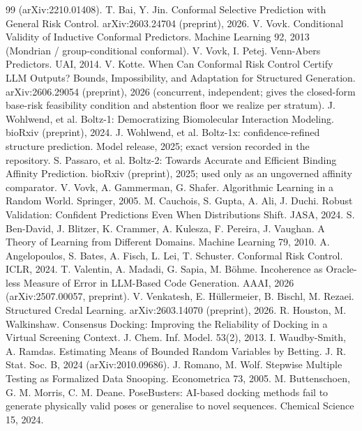 \documentclass[10pt]{article}
\begin{document}
\begin{thebibliography}{99}
(arXiv:2210.01408).
 T. Bai, Y. Jin. Conformal Selective Prediction with General Risk Control.
arXiv:2603.24704 (preprint), 2026.
 V. Vovk. Conditional Validity of Inductive Conformal Predictors. Machine Learning 92, 2013
(Mondrian / group-conditional conformal).
 V. Vovk, I. Petej. Venn-Abers Predictors. UAI, 2014.
 V. Kotte. When Can Conformal Risk Control Certify LLM Outputs? Bounds, Impossibility, and
Adaptation for Structured Generation. arXiv:2606.29054 (preprint), 2026 (concurrent, independent; gives the
closed-form base-risk feasibility condition and abstention floor we realize per stratum).
 J. Wohlwend, et al. Boltz-1: Democratizing Biomolecular Interaction Modeling. bioRxiv
(preprint), 2024.
 J. Wohlwend, et al. Boltz-1x: confidence-refined structure prediction. Model release,
2025; exact version recorded in the repository.
 S. Passaro, et al. Boltz-2: Towards Accurate and Efficient Binding Affinity Prediction.
bioRxiv (preprint), 2025; used only as an ungoverned affinity comparator.
 V. Vovk, A. Gammerman, G. Shafer. Algorithmic Learning in a Random World. Springer, 2005.
 M. Cauchois, S. Gupta, A. Ali, J. Duchi. Robust Validation: Confident Predictions
Even When Distributions Shift. JASA, 2024.
 S. Ben-David, J. Blitzer, K. Crammer, A. Kulesza, F. Pereira, J. Vaughan.
A Theory of Learning from Different Domains. Machine Learning 79, 2010.
 A. Angelopoulos, S. Bates, A. Fisch, L. Lei, T. Schuster.
Conformal Risk Control. ICLR, 2024.
 T. Valentin, A. Madadi, G. Sapia, M. B\"ohme. Incoherence as Oracle-less Measure of
Error in LLM-Based Code Generation. AAAI, 2026 (arXiv:2507.00057, preprint).
 V. Venkatesh, E. H\"ullermeier, B. Bischl, M. Rezaei. Structured Credal Learning.
arXiv:2603.14070 (preprint), 2026.
 R. Houston, M. Walkinshaw. Consensus Docking: Improving the Reliability of
Docking in a Virtual Screening Context. J. Chem. Inf. Model. 53(2), 2013.
 I. Waudby-Smith, A. Ramdas. Estimating Means of Bounded Random Variables by
Betting. J. R. Stat. Soc. B, 2024 (arXiv:2010.09686).
 J. Romano, M. Wolf. Stepwise Multiple Testing as Formalized Data Snooping.
Econometrica 73, 2005.
 M. Buttenschoen, G. M. Morris, C. M. Deane. PoseBusters: AI-based docking methods
fail to generate physically valid poses or generalise to novel sequences. Chemical Science 15, 2024.

\end{thebibliography}
\end{document}
